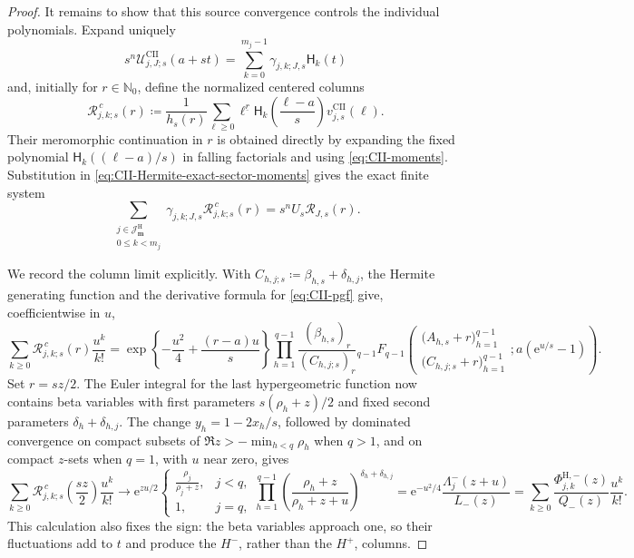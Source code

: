 \documentclass[10pt]{amsart}
\newcommand{\Nzero}{\mathbb N_0}
\newcommand{\e}{\mathrm e}
\newcommand{\mm}{\boldsymbol m}
\newcommand{\fall}[2]{#1^{\underline{#2}}}
\newcommand{\pFq}[5]{{}_{#1}F_{#2}\!\left(\begin{matrix}#3\\#4\end{matrix};#5\right)}
\theoremstyle{plain}
\theoremstyle{definition}
\theoremstyle{remark}
\begin{document}
\begin{proof}
It remains to show that this source convergence controls the individual
polynomials.  Expand uniquely
\[
 s^n\mathscr U_{j,J;s}^{\mathrm{CII}}(a+st)
 =\sum_{k=0}^{m_j-1}\gamma_{j,k;J,s}\mathsf H_k(t)
\]
and, initially for \(r\in\Nzero\), define the normalized centered
columns
\[
 \mathscr R_{j,k;s}^{\,c}(r)\coloneq
 \frac{1}{h_s(r)}
 \sum_{\ell\ge0}\fall{\ell}{r}
 \mathsf H_k\left(\frac{\ell-a}{s}\right)
 v_{j,s}^{\mathrm{CII}}(\ell).
\]
Their meromorphic continuation in \(r\) is obtained directly by
expanding the fixed polynomial
\(\mathsf H_k((\ell-a)/s)\) in falling factorials and using
\eqref{eq:CII-moments}.  Substitution in
\eqref{eq:CII-Hermite-exact-sector-moments} gives the exact finite
system
\begin{equation}
 \sum_{\substack{j\in\mathcal J_{\mm}^{\mathrm H}\\0\le k<m_j}}
 \gamma_{j,k;J,s}
 \mathscr R_{j,k;s}^{\,c}(r)
 =s^nU_s\mathcal R_{J,s}(r).
 \label{eq:CII-Hermite-centered-sector-system}
\end{equation}

We record the column limit explicitly.  With
\(C_{h,j;s}\coloneq\beta_{h,s}+\delta_{h,j}\), the Hermite generating
function and the derivative formula for
\eqref{eq:CII-pgf} give, coefficientwise in \(u\),
\begin{equation}
 \sum_{k\ge0}\mathscr R_{j,k;s}^{\,c}(r)\frac{u^k}{k!}
 =
 \exp\left\{-\frac{u^2}{4}+\frac{(r-a)u}{s}\right\}
 \prod_{h=1}^{q-1}\frac{(\beta_{h,s})_r}{(C_{h,j;s})_r}
 \pFq{q-1}{q-1}
 {\bigl(A_{h,s}+r\bigr)_{h=1}^{q-1}}
 {\bigl(C_{h,j;s}+r\bigr)_{h=1}^{q-1}}
 {a(\e^{u/s}-1)}.
 \label{eq:CII-Hermite-centered-column-generating}
\end{equation}
Set \(r=sz/2\).  The Euler integral for the last hypergeometric
function now contains beta variables with first parameters
\(s(\rho_h+z)/2\) and fixed second parameters
\(\delta_h+\delta_{h,j}\).  The change
\(y_h=1-2x_h/s\), followed by dominated convergence on compact
subsets of \(\Re z>-\min_{h<q}\rho_h\) when \(q>1\), and on compact
\(z\)-sets when \(q=1\), with \(u\) near zero, gives
\begin{equation}
 \sum_{k\ge0}
 \mathscr R_{j,k;s}^{\,c}\left(\frac{sz}{2}\right)\frac{u^k}{k!}
 \longrightarrow
 \e^{zu/2}
 \begin{cases}
  \displaystyle\frac{\rho_j}{\rho_j+z},&j<q,\\
  1,&j=q,
 \end{cases}
 \prod_{h=1}^{q-1}
 \left(\frac{\rho_h+z}{\rho_h+z+u}\right)^{
 \delta_h+\delta_{h,j}}
=\e^{-u^2/4}\frac{\Lambda_j^-(z+u)}{L_-(z)}
 =\sum_{k\ge0}\frac{\Phi_{j,k}^{\mathrm H,-}(z)}
 {Q_-(z)}\frac{u^k}{k!}.
 \label{eq:CII-Hermite-centered-column-limit}
\end{equation}
This calculation also fixes the sign: the beta variables approach one,
so their fluctuations add to \(t\) and produce the \(H^-\), rather than
the \(H^+\), columns.


\end{proof}
\end{document}
